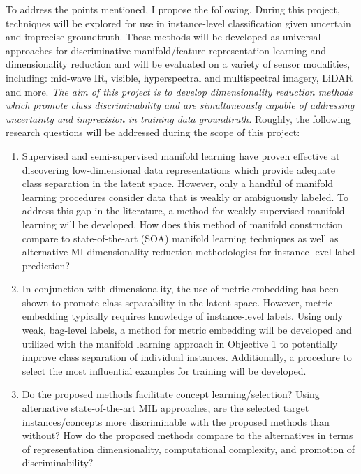 To address the points mentioned, I propose the following.  During this project, techniques will be explored for use in instance-level classification given uncertain and imprecise groundtruth.  These methods will be developed as universal approaches for discriminative manifold/feature representation learning and dimensionality reduction and will be evaluated on a variety of sensor modalities, including: mid-wave IR, visible, hyperspectral and multispectral imagery, LiDAR and more.  \textit{The aim of this project is to develop dimensionality reduction methods which promote class discriminability and are simultaneously capable of addressing uncertainty and imprecision in training data groundtruth.} Roughly, the following research questions will be addressed during the scope of this project:
\begin{enumerate}
	\item Supervised and semi-supervised manifold learning have proven effective at discovering low-dimensional data representations which provide adequate class separation in the latent space.  However, only a handful of manifold learning procedures consider data that is weakly or ambiguously labeled.  To address this gap in the literature, a method for weakly-supervised manifold learning will be developed. How does this method of manifold construction compare to state-of-the-art (SOA) manifold learning techniques as well as alternative MI dimensionality reduction methodologies for instance-level label prediction?
	\item In conjunction with dimensionality, the use of metric embedding has been shown to promote class separability in the latent space. However, metric embedding typically requires knowledge of instance-level labels.  Using only weak, bag-level labels, a method for metric embedding will be developed and utilized with the manifold learning approach in Objective 1 to potentially improve class separation of individual instances.  Additionally, a procedure to select the most influential examples for training will be developed.
	\item Do the proposed methods facilitate concept learning/selection?  Using alternative state-of-the-art MIL approaches, are the selected target instances/concepts more discriminable with the proposed methods than without?  How do the proposed methods compare to the alternatives in terms of representation dimensionality, computational complexity, and promotion of discriminability?
\end{enumerate} 

